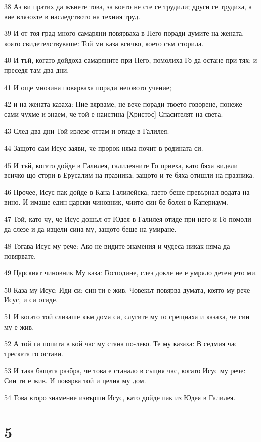\par 38 Аз ви пратих да жънете това, за което не сте се трудили; други се трудиха, а вие влязохте в наследството на техния труд.
\par 39 И от тоя град много самаряни повярваха в Него поради думите на жената, която свидетелствуваше: Той ми каза всичко, което съм сторила.
\par 40 И тъй, когато дойдоха самаряните при Него, помолиха Го да остане при тях; и преседя там два дни.
\par 41 И още мнозина повярваха поради неговото учение;
\par 42 и на жената казаха: Ние вярваме, не вече поради твоето говорене, понеже сами чухме и знаем, че той е наистина [Христос] Спасителят на света.
\par 43 След два дни Той излезе оттам и отиде в Галилея.
\par 44 Защото сам Исус заяви, че пророк няма почит в родината си.
\par 45 И тъй, когато дойде в Галилея, галилеяните Го приеха, като бяха видели всичко що стори в Ерусалим на празника; защото и те бяха отишли на празника.
\par 46 Прочее, Исус пак дойде в Кана Галилейска, гдето беше превърнал водата на вино. И имаше един царски чиновник, чиито син бе болен в Капериаум.
\par 47 Той, като чу, че Исус дошъл от Юдея в Галилея отиде при него и Го помоли да слезе и да изцели сина му, защото беше на умиране.
\par 48 Тогава Исус му рече: Ако не видите знамения и чудеса никак няма да повярвате.
\par 49 Царският чиновник Му каза: Господине, слез докле не е умряло детенцето ми.
\par 50 Каза му Исус: Иди си; син ти е жив. Човекът повярва думата, която му рече Исус, и си отиде.
\par 51 И когато той слизаше към дома си, слугите му го срещнаха и казаха, че син му е жив.
\par 52 А той ги попита в кой час му стана по-леко. Те му казаха: В седмия час треската го остави.
\par 53 И така бащата разбра, че това е станало в същия час, когато Исус му рече: Син ти е жив. И повярва той и целия му дом.
\par 54 Това второ знамение извърши Исус, като дойде пак из Юдея в Галилея.

\chapter{5}

